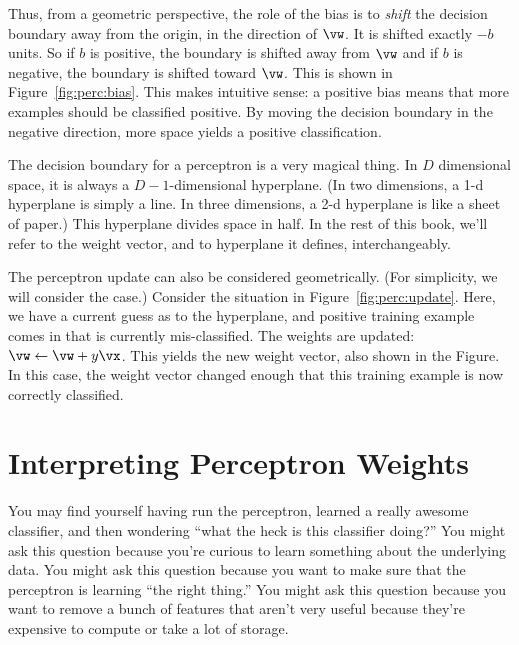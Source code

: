 
Thus, from a geometric perspective, the role of the bias is to
\emph{shift} the decision boundary away from the origin, in the
direction of $\vw$.  It is shifted exactly $-b$ units.  So if $b$ is
positive, the boundary is shifted away from $\vw$ and if $b$ is
negative, the boundary is shifted toward $\vw$.  This is shown in
Figure~\ref{fig:perc:bias}.  This makes intuitive sense: a positive
bias means that more examples should be classified positive.  By
moving the decision boundary in the negative direction, more space
yields a positive classification.

The decision boundary for a perceptron is a very magical thing.  In
$D$ dimensional space, it is always a $D-1$-dimensional hyperplane.
(In two dimensions, a 1-d hyperplane is simply a line.  In three
dimensions, a 2-d hyperplane is like a sheet of paper.)  This
hyperplane divides space in half.  In the rest of this book, we'll
refer to the weight vector, and to hyperplane it defines,
interchangeably.


The perceptron update can also be considered geometrically.  (For
simplicity, we will consider the  case.)  Consider
the situation in Figure~\ref{fig:perc:update}.  Here, we have a current
guess as to the hyperplane, and positive training example comes in
that is currently mis-classified.  The weights are updated: $\vw
\leftarrow \vw + y \vx$.  This yields the new weight vector, also
shown in the Figure.  In this case, the weight vector changed enough
that this training example is now correctly classified.

\section{Interpreting Perceptron Weights}

You may find yourself having run the perceptron, learned a really awesome classifier, and then wondering ``what the heck is this classifier doing?''
You might ask this question because you're curious to learn something about the underlying data.
You might ask this question because you want to make sure that the perceptron is learning ``the right thing.''
You might ask this question because you want to remove a bunch of features that aren't very useful because they're expensive to compute or take a lot of storage.

